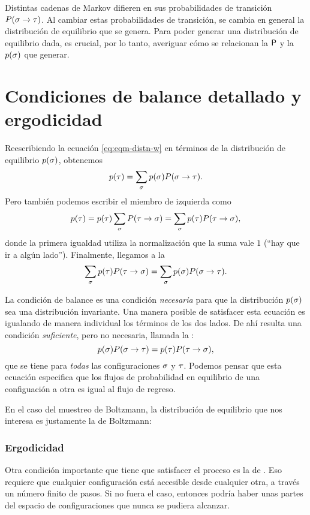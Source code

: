 Distintas cadenas de Markov difieren en sus probabilidades de transición $P(\ss \to \tt)$. Al cambiar estas probabilidades de transición, se cambia en general la distribución de equilibrio que se genera. Para poder generar una distribución de equilibrio dada, es crucial, por lo tanto, averiguar cómo se relacionan la $\PP$ y la $p(\ss)$ que generar.


\section{Condiciones de balance detallado y ergodicidad}

Reescribiendo la ecuación \eqref{eq:eqm-distn-w} en términos de la distribución de equilibrio $p(\ss)$, obtenemos
\begin{equation}
 p(\tau) = \sum_\ss p(\ss) P(\ss \to \tau).
\end{equation}
Pero también podemos escribir el miembro de izquierda como
\begin{equation}
  p(\tau) = p(\tau) \sum_\ss P(\tau \to \ss) = \sum_\ss p(\tau) P(\tau \to \ss),
\end{equation}
donde la primera igualdad utiliza la normalización que la suma vale $1$ (``hay que ir a algún lado'').
Finalmente, llegamos a la  
\begin{equation}
 \sum_\ss p(\tau) P(\tau \to \ss) = \sum_\ss p(\ss) P(\ss \to \tau).
\end{equation}

La condición de balance es una condición \emph{necesaria} para que la distribución $p(\ss)$ sea una distribución invariante.
Una manera posible de satisfacer esta ecuación es igualando de manera individual los términos de los dos lados. De ahí resulta una condición
\emph{suficiente}, pero no necesaria, llamada la :
\begin{equation}
p(\ss) P(\ss \to \tau) =  p(\tau) P(\tau \to \ss),
\end{equation}
que se tiene para \emph{todas} las configuraciones $\ss$ y $\tt$.
Podemos pensar que esta ecuación especifica que los flujos de probabilidad en equilibrio de una configuación a otra es igual al flujo de regreso.

En el caso del muestreo de Boltzmann, la distribución de equilibrio que nos interesa es justamente la de Boltzmann:

\subsubsection{Ergodicidad}
Otra condición importante que tiene que satisfacer el proceso es la de . Eso requiere que cualquier configuración está accesible
desde cualquier otra, a través un número finito de pasos. Si no fuera el caso, entonces podría haber unas partes del espacio de configuraciones que nunca se
pudiera alcanzar.








